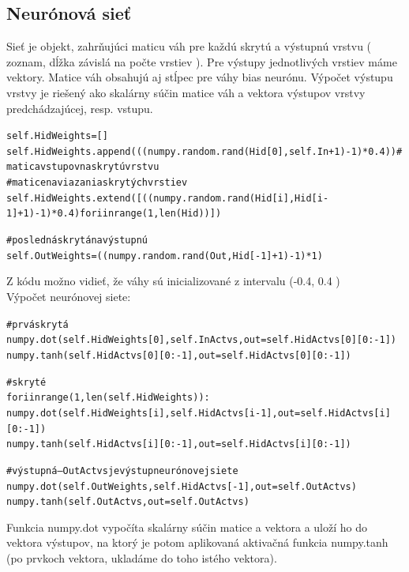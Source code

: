 \documentclass[11pt,a4paper]{article}
\begin{document}
\subsection{Neurónová sieť}
Sieť je objekt, zahrňujúci maticu váh pre každú skrytú a výstupnú vrstvu ( zoznam, dĺžka závislá na počte vrstiev ). Pre výstupy jednotlivých vrstiev máme vektory. Matice váh obsahujú aj stĺpec pre váhy bias neurónu. Výpočet výstupu vrstvy je riešený ako skalárny súčin matice váh a vektora výstupov vrstvy predchádzajúcej, resp. vstupu. 
\begin{alltt}
\begin{small}
self.HidWeights = []
self.HidWeights.append(((numpy.random.rand(Hid[0], self.In + 1)-1)*0.4)) \#matica vstupov na skrytú vrstvu
\# matice naviazania skrytých vrstiev
self.HidWeights.extend([((numpy.random.rand(Hid[i], Hid[i-1] + 1)-1)*0.4) for i in range(1,len(Hid))]) 

\# posledná skrytá na výstupnú
self.OutWeights = ((numpy.random.rand(Out, Hid[-1] + 1)-1)*1)
\end{small}
\end{alltt}
Z kódu možno vidieť, že váhy sú inicializované z intervalu (-0.4, 0.4 )\\
Výpočet neurónovej siete:
\begin{alltt}
\#prvá skrytá
numpy.dot(self.HidWeights[0], self.InActvs, out=self.HidActvs[0][0:-1])
numpy.tanh(self.HidActvs[0][0:-1], out=self.HidActvs[0][0:-1])

\#skryté
for i in range(1, len(self.HidWeights)):
	numpy.dot(self.HidWeights[i],self.HidActvs[i-1], out=self.HidActvs[i][0:-1])
	numpy.tanh(self.HidActvs[i][0:-1], out=self.HidActvs[i][0:-1])
	
\#výstupná -- OutActvs je výstup neurónovej siete
numpy.dot(self.OutWeights, self.HidActvs[-1], out=self.OutActvs)
numpy.tanh(self.OutActvs, out=self.OutActvs)
\end{alltt}
Funkcia numpy.dot vypočíta skalárny súčin matice a vektora a uloží ho do vektora výstupov, na ktorý je potom aplikovaná aktivačná funkcia numpy.tanh (po prvkoch vektora, ukladáme do toho istého vektora).\\
\end{document}

